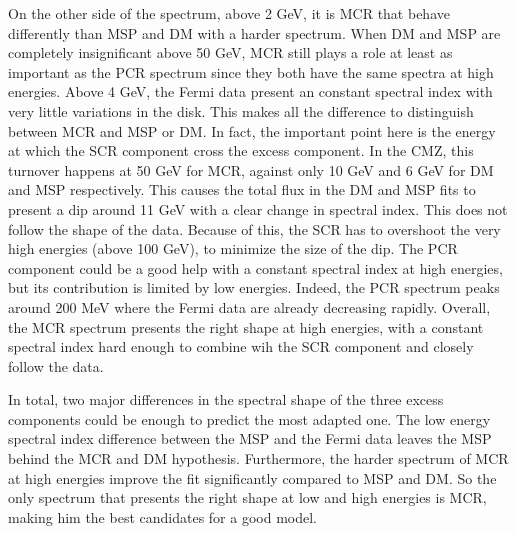 On the other side of the spectrum, above 2 GeV, it is MCR that behave differently than MSP and DM with a harder spectrum. When DM and MSP are completely insignificant above 50 GeV, MCR still plays a role at least as important as the PCR spectrum since they both have the same spectra at high energies. Above 4 GeV, the Fermi data present an constant spectral index with very little variations in the disk. This makes all the difference to distinguish between MCR and MSP or DM. In fact, the important point here is the energy at which the SCR component cross the excess component. In the CMZ, this turnover happens at 50 GeV for MCR, against only 10 GeV and 6 GeV for DM and MSP respectively. This causes the total flux in the DM and MSP fits to present a dip around 11 GeV with a clear change in spectral index. This does not follow the shape of the data. Because of this, the SCR has to overshoot the very high energies (above 100 GeV), to minimize the size of the dip. The PCR component could be a good help with a constant spectral index at high energies, but its contribution is limited by low energies. Indeed, the PCR spectrum peaks around 200 MeV where the Fermi data are already decreasing rapidly. Overall, the MCR spectrum presents the right shape at high energies, with a constant spectral index hard enough to combine wih the SCR component and closely follow the data.


In total, two major differences in the spectral shape of the three excess components could be enough to predict the most adapted one. The low energy spectral index difference between the MSP and the Fermi data leaves the MSP behind the MCR and DM hypothesis. Furthermore, the harder spectrum of MCR at high energies improve the fit significantly compared to MSP and DM. So the only spectrum that presents the right shape at low and high energies is MCR, making him the best candidates for a good model.















